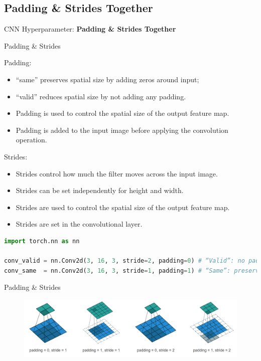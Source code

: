 \subsection{Padding \& Strides Together}
\begin{frame}{}
    \LARGE CNN Hyperparameter: \textbf{Padding \& Strides Together}
\end{frame}

\begin{frame}[fragile]{Padding \& Strides}
\begin{block}{Padding:}
    \begin{itemize}
        \item “same” preserves spatial size by adding zeros around input;
        \item “valid” reduces spatial size by not adding any padding.
        \item Padding is used to control the spatial size of the output feature map.
        \item Padding is added to the input image before applying the convolution operation.
    \end{itemize}
\end{block}

\begin{block}{Strides:}
    \begin{itemize}
        \item Strides control how much the filter moves across the input image.
        \item Strides can be set independently for height and width.
        \item Strides are used to control the spatial size of the output feature map.
        \item Strides are set in the convolutional layer.
    \end{itemize}
\end{block}

\begin{lstlisting}[language=Python, caption={Code snippet (PyTorch)}, basicstyle=\ttfamily\footnotesize]
import torch.nn as nn

conv_valid = nn.Conv2d(3, 16, 3, stride=2, padding=0) # “Valid”: no padding (padding=0)
conv_same  = nn.Conv2d(3, 16, 3, stride=1, padding=1) # “Same”: preserve size
\end{lstlisting}
\end{frame}  

\begin{frame}{Padding \& Strides}
    \begin{figure}
    \centering
    \includegraphics[width=1\textwidth,height=1\textheight,keepaspectratio]{images/cnn/padding-stride.png}
    \end{figure}
\end{frame}

